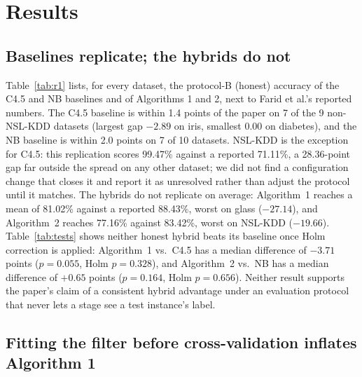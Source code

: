 \section{Results}
\label{sec:results}

\subsection{Baselines replicate; the hybrids do not}

Table~\ref{tab:r1} lists, for every dataset, the protocol-B (honest)
accuracy of the C4.5 and NB baselines and of Algorithms 1 and 2, next to
Farid et al.'s reported numbers. The C4.5 baseline is within 1.4 points of
the paper on 7 of the 9 non-NSL-KDD datasets (largest gap $-2.89$ on iris,
smallest 0.00 on diabetes), and the NB baseline is within 2.0 points on 7
of 10 datasets. NSL-KDD is the exception for C4.5: this replication scores
99.47\% against a reported 71.11\%, a 28.36-point gap far outside the
spread on any other dataset; we did not find a configuration change that
closes it and report it as unresolved rather than adjust the protocol
until it matches. The hybrids do not replicate on average: Algorithm~1
reaches a mean of 81.02\% against a reported 88.43\%, worst on glass
($-27.14$), and Algorithm~2 reaches 77.16\% against 83.42\%, worst on
NSL-KDD ($-19.66$). Table~\ref{tab:tests} shows neither honest hybrid
beats its baseline once Holm correction is applied: Algorithm~1 vs.\ C4.5
has a median difference of $-3.71$ points ($p=0.055$, Holm $p=0.328$), and
Algorithm~2 vs.\ NB has a median difference of $+0.65$ points ($p=0.164$,
Holm $p=0.656$). Neither result supports the paper's claim of a
consistent hybrid advantage under an evaluation protocol that never lets a
stage see a test instance's label.



\subsection{Fitting the filter before cross-validation inflates Algorithm 1}

